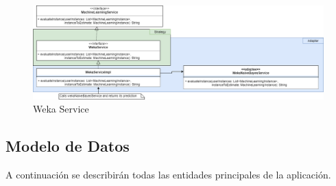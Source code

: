 \documentclass[12pt, a4paper, twoside]{book}
\begin{document}
\begin{itemize}
		\begin{figure}[H]
			\centering
			\includegraphics[width=15cm]{Imagenes/WekaService.png}
			\caption{Weka Service}\label{Weka Service}
		\end{figure}
	\end{itemize}

	\subsection{Modelo de Datos}
	A continuación se describirán todas las entidades principales de la aplicación.
\end{document}
